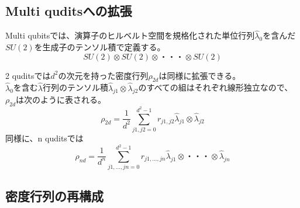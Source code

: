 \documentclass[11pt,a4j,notitlepage]{jreport}
\begin{document}
	\subsection{Multi quditsへの拡張}

	Multi qubitsでは、演算子のヒルベルト空間を規格化された単位行列$\hat{\lambda}_0$を含んだ$SU(2)$を生成子のテンソル積で定義する。
	\begin{equation}
		SU(2) \otimes SU(2) \otimes ・・・ \otimes SU(2)
	\end{equation}

	2 quditsでは$d^2$の次元を持った密度行列$\rho_{2 d}$は同様に拡張できる。\\
	$\hat{\lambda}_0$を含む$\hat{\lambda}$行列のテンソル積$\hat{\lambda}_{j 1} \otimes \hat{\lambda}_{j 2}$のすべての組はそれぞれ線形独立なので、$\rho_{2 d}$は次のように表される。
	\begin{equation}
		\rho_{2 d} = \frac{1}{d^2} \sum_{j1,j2=0}^{d^2 - 1} r_{j 1, j 2} \hat{\lambda}_{j 1} \otimes \hat{\lambda}_{j 2}
	\end{equation}
	同様に、n quditsでは
	\begin{equation}
		\rho_{n d} = \frac{1}{d^n} \sum_{j1,...,jn=0}^{d^2 - 1} r_{j 1,...,j n} \hat{\lambda}_{j 1} \otimes ・・・ \otimes \hat{\lambda}_{j n}
	\end{equation}

	\subsection{密度行列の再構成}
\end{document}
